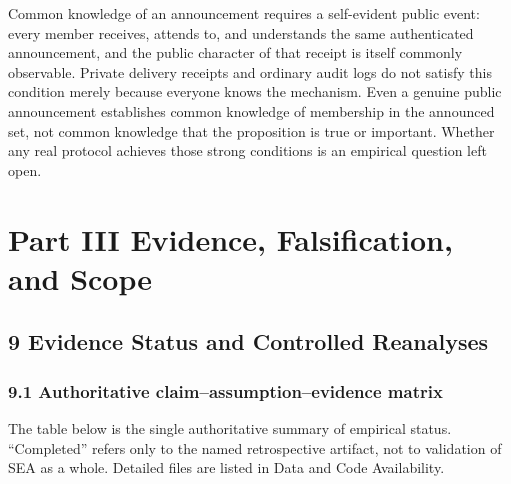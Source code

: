 \documentclass[
  11pt]{article}
\begin{document}
Common knowledge of an announcement requires a self-evident public
event: every member receives, attends to, and understands the same
authenticated announcement, and the public character of that receipt is
itself commonly observable. Private delivery receipts and ordinary audit
logs do not satisfy this condition merely because everyone knows the
mechanism. Even a genuine public announcement establishes common
knowledge of membership in the announced set, not common knowledge that
the proposition is true or important. Whether any real protocol achieves
those strong conditions is an empirical question left open.

\section{Part III Evidence, Falsification, and
Scope}\label{part-iii-evidence-falsification-and-scope}

\subsection{9 Evidence Status and Controlled
Reanalyses}\label{evidence-status-and-controlled-reanalyses}

\subsubsection{9.1 Authoritative claim--assumption--evidence
matrix}\label{authoritative-claimassumptionevidence-matrix}

The table below is the single authoritative summary of empirical status.
``Completed'' refers only to the named retrospective artifact, not to
validation of SEA as a whole. Detailed files are listed in Data and Code
Availability.
\end{document}
